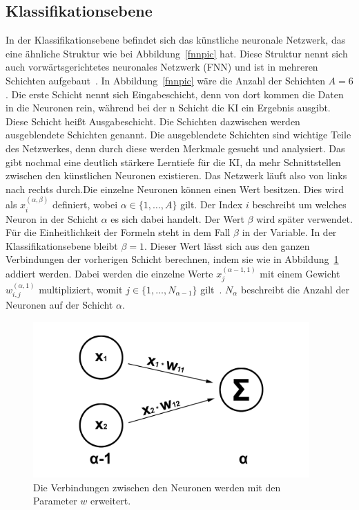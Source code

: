 \documentclass[11pt]{article}
\begin{document}
\subsection{Klassifikationsebene}\label{fcnn}
In der Klassifikationsebene befindet sich das künstliche neuronale Netzwerk, das eine ähnliche Struktur wie bei Abbildung~\ref{fnnpic} hat.
Diese Struktur nennt sich auch vorwärtsgerichtetes neuronales Netzwerk (FNN) und ist in mehreren Schichten aufgebaut~\cite{5}. In Abbildung~\ref{fnnpic} wäre die Anzahl
der Schichten $A = 6$. Die erste Schicht nennt sich Eingabeschicht, denn von dort kommen die Daten in die Neuronen rein, während bei
der n Schicht die KI ein Ergebnis ausgibt. Diese Schicht heißt Ausgabeschicht. Die Schichten dazwischen werden ausgeblendete Schichten genannt.
Die ausgeblendete Schichten sind wichtige Teile des Netzwerkes, denn durch diese werden Merkmale gesucht und analysiert.
Das gibt nochmal eine deutlich stärkere Lerntiefe für die KI, da mehr Schnittstellen zwischen den künstlichen Neuronen existieren.
Das Netzwerk läuft also von links nach rechts durch.\@ Die einzelne Neuronen können einen Wert besitzen. Dies wird als $ x_{i}^{(\alpha,\beta)} $ definiert,
wobei $ \alpha \in \{1,\ldots,A\} $ gilt. Der Index $i$ beschreibt um welches Neuron in der Schicht $\alpha$ es sich dabei handelt. Der Wert $\beta$ wird später
verwendet. Für die Einheitlichkeit der Formeln steht in dem Fall $\beta$ in der Variable. In der Klassifikationsebene bleibt $\beta = 1$. Dieser Wert
lässt sich aus den ganzen Verbindungen der vorherigen Schicht berechnen, indem sie wie in Abbildung~\ref{connection} addiert werden. Dabei werden
die einzelne Werte $ x_{j}^{(\alpha-1,1)} $ mit einem Gewicht $ w_{i,j}^{(\alpha,1)} $ multipliziert, womit $ j \in \{1,\ldots,N_{\alpha-1}\} $ gilt~\cite{5}.
$ N_{\alpha} $ beschreibt die Anzahl der Neuronen auf der Schicht $\alpha$.
\begin{figure}[h]
    \centering
    \includegraphics[width=300pt, keepaspectratio]{images/verbindung}
    \caption[Verbindungen zwischen den Neuronen]{Die Verbindungen zwischen den Neuronen werden mit den Parameter $w$ erweitert.}\label{connection}
\end{figure}
\end{document}
